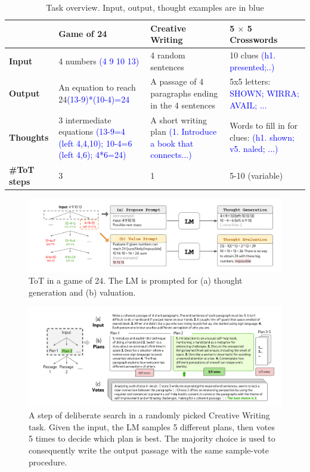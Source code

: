 \documentclass{article}
\begin{document}
\begin{table}[H]
    \centering
    \begin{tabularx}{\textwidth}{|X|X|X|X|}
        \hline
        & \textbf{Game of 24} & \textbf{Creative Writing} & \textbf{5 $\times$ 5 Crosswords} \\
        \hline
        \textbf{Input} & 4 numbers \textcolor{blue}{(4 9 10 13)} & 4 random sentences & 10 clues \textcolor{blue}{(h1. presented;..)}\\
        \hline
        \textbf{Output} & An equation to reach 24\textcolor{blue}{(13-9)*(10-4)=24} & A passage of 4 paragraphs ending in the 4 sentences & 5x5 letters: \textcolor{blue}{SHOWN; WIRRA; AVAIL; ...} \\
        \hline
        \textbf{Thoughts} & 3 intermediate equations \textcolor{blue}{(13-9=4 (left 4,4,10); 10-4=6 (left 4,6); 4*6=24)} & A short writing plan \textcolor{blue}{(1. Introduce a book that connects...)} & Words to fill in for clues: \textcolor{blue}{(h1. shown; v5. naled; ...)} \\
        \hline
        \textbf{\#ToT steps} & 3 & 1 & 5-10 (variable) \\
        \hline
        \end{tabularx}

        \caption{Task overview. Input, output, thought examples are in blue}
        \label{tab:Table1}
\end{table}

\begin{figure}[H]
    \centering
    \includegraphics[width=\textwidth]{./Images/Figure2.png}
    \caption{ToT in a game of 24. The LM is prompted for (a) thought generation and (b) valuation.}
    \label{fig:Figure2}
\end{figure}

\begin{figure}[H]
    \centering
    \includegraphics[width=\textwidth]{./Images/Figure4.png}
    \caption{A step of deliberate search in a randomly picked Creative Writing task. Given the input, the LM samples 5 different plans, then votes 5 times to decide which plan is best. The majority choice is used to consequently write the output passage with the same sample-vote procedure.}
    \label{fig:Figure4}
\end{figure}
\end{document}
